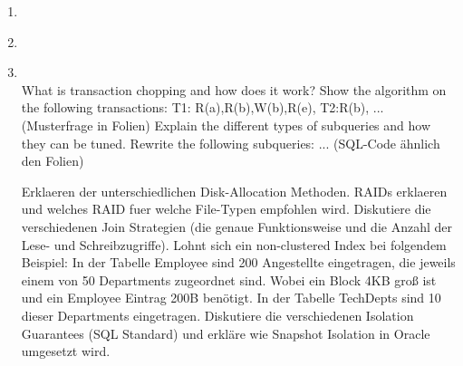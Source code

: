 \documentclass[12pt]{article}\pagestyle{myheadings}
\theoremstyle{plain}
\begin{document}
\begin{enumerate}
\begin{itemize}
 

\end{itemize}

\item \textbf{} \\
\item \textbf{} \\
\item \textbf{} \\
What is transaction chopping and how does it work? Show the algorithm on the following transactions: T1:
R(a),R(b),W(b),R(e), T2:R(b), ... (Musterfrage in Folien)
Explain the different types of subqueries and how they can be tuned. Rewrite the following subqueries: ...
(SQL-Code ähnlich den Folien)

Erklaeren der unterschiedlichen Disk-Allocation Methoden. RAIDs erklaeren und welches RAID fuer welche
File-Typen empfohlen wird. 
Diskutiere die verschiedenen Join Strategien (die genaue Funktionsweise und die Anzahl der Lese- und
Schreibzugriffe). Lohnt sich ein non-clustered Index bei folgendem Beispiel: In der Tabelle Employee sind 200
Angestellte eingetragen, die jeweils einem von 50 Departments zugeordnet sind. Wobei ein Block 4KB groß ist
und ein Employee Eintrag 200B benötigt. In der Tabelle TechDepts sind 10 dieser Departments eingetragen.
Diskutiere die verschiedenen Isolation Guarantees (SQL Standard) und erkläre wie Snapshot Isolation in
Oracle umgesetzt wird.




\end{enumerate}
\end{document}

